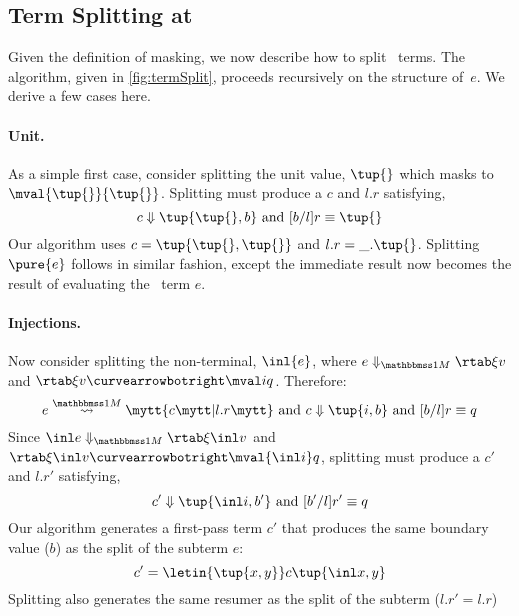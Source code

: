 \begin{abstrsyn}



\subsection{Term Splitting at \bbonem}
\label{sec:split-one}

Given the definition of masking, we now describe how to split
\bbonem\ terms. The algorithm, given in \cref{fig:termSplit}, proceeds
recursively on the structure of~$e$. We derive a few cases here.

\paragraph {Unit.} 
As a simple first case, consider splitting the unit value, $\tup{}$
which masks to $\mval {\tup{}} {\tup{}}$.
Splitting must produce a $c$ and $l.r$ satisfying,
\[
	\reduce c {\tup{\tup{},b}} \text{ and } [b/l]r \equiv \tup{}
\]
Our algorithm uses $c=\tup{\tup{},\tup{}}$ and $l.r = \_.\tup{}$.
Splitting $\pure{e}$ follows in similar fashion, except the immediate
result now becomes the result of evaluating the \bbonep\ term $e$.

\paragraph {Injections.}
Now consider splitting the non-terminal, $\inl {e}$, where $\diaone
{e} \xi v$ and $\rtab \xi v \vsplito \mval i q$. Therefore:
\[
	\splitone e A c {l.r} \text{ and } \reduce c {\tup{i,b}} \text{ and } [b/l]r \equiv q
\]
Since $\diaone {\inl e} \xi {\inl v}$ and $\rtab \xi {\inl v} \vsplito \mval {\inl i} q$,
splitting must produce a $c'$ and $l.r'$ satisfying,
\[
	\reduce {c'} {\tup{\inl i,b'}} \text{ and } [b'/l]r' \equiv q
\]
Our algorithm generates a first-pass term $c'$ that produces the same
boundary value ($b$) as the split of the subterm $e$:
\[
c' = \letin {\tup {x,y}} c {\tup{\inl x, y}}
\]
Splitting also generates the same resumer as the split of the
subterm ($l.r' = l.r$)


\end{abstrsyn}

